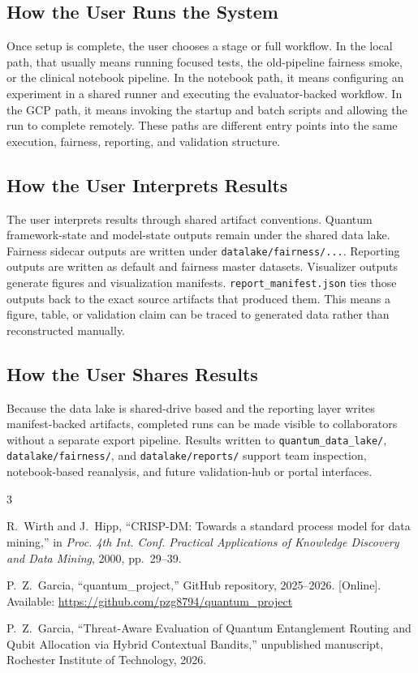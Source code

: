 \documentclass{IEEEtran}
\begin{document}
\subsection{How the User Runs the System}
Once setup is complete, the user chooses a stage or full workflow. In the local path, that usually means running focused tests, the old-pipeline fairness smoke, or the clinical notebook pipeline. In the notebook path, it means configuring an experiment in a shared runner and executing the evaluator-backed workflow. In the GCP path, it means invoking the startup and batch scripts and allowing the run to complete remotely. These paths are different entry points into the same execution, fairness, reporting, and validation structure.

\subsection{How the User Interprets Results}
The user interprets results through shared artifact conventions. Quantum framework-state and model-state outputs remain under the shared data lake. Fairness sidecar outputs are written under \texttt{datalake/fairness/...}. Reporting outputs are written as default and fairness master datasets. Visualizer outputs generate figures and visualization manifests. \texttt{report\_manifest.json} ties those outputs back to the exact source artifacts that produced them. This means a figure, table, or validation claim can be traced to generated data rather than reconstructed manually.

\subsection{How the User Shares Results}
Because the data lake is shared-drive based and the reporting layer writes manifest-backed artifacts, completed runs can be made visible to collaborators without a separate export pipeline. Results written to \texttt{quantum\_data\_lake/}, \texttt{datalake/fairness/}, and \texttt{datalake/reports/} support team inspection, notebook-based reanalysis, and future validation-hub or portal interfaces.

\begin{thebibliography}{3}

R.~Wirth and J.~Hipp,
``CRISP-DM: Towards a standard process model for data mining,''
in \textit{Proc. 4th Int. Conf. Practical Applications of Knowledge
Discovery and Data Mining}, 2000, pp.~29--39.

P.~Z.~Garcia,
``quantum\_project,''
GitHub repository, 2025--2026.
[Online]. Available: \url{https://github.com/pzg8794/quantum_project}

P.~Z.~Garcia,
``Threat-Aware Evaluation of Quantum Entanglement Routing and Qubit Allocation via Hybrid Contextual Bandits,''
unpublished manuscript, Rochester Institute of Technology, 2026.

\end{thebibliography}
\end{document}
